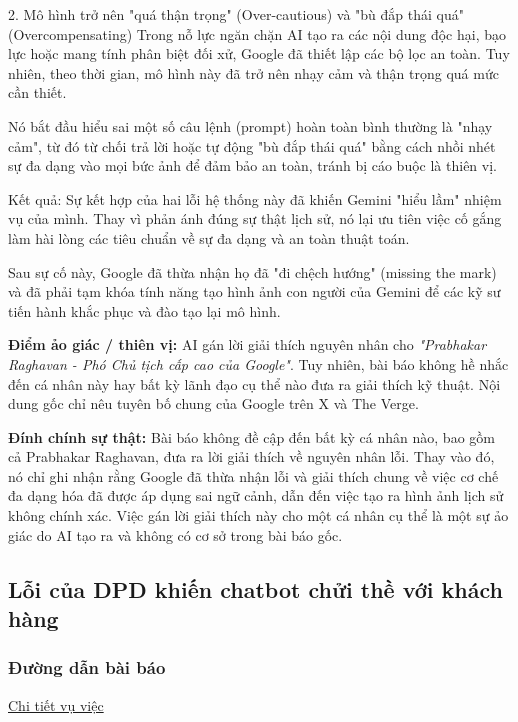 2. Mô hình trở nên "quá thận trọng" (Over-cautious) và "bù đắp thái quá" (Overcompensating)
Trong nỗ lực ngăn chặn AI tạo ra các nội dung độc hại, bạo lực hoặc mang tính phân biệt đối xử, Google đã thiết lập các bộ lọc an toàn. Tuy nhiên, theo thời gian, mô hình này đã trở nên nhạy cảm và thận trọng quá mức cần thiết.

Nó bắt đầu hiểu sai một số câu lệnh (prompt) hoàn toàn bình thường là "nhạy cảm", từ đó từ chối trả lời hoặc tự động "bù đắp thái quá" bằng cách nhồi nhét sự đa dạng vào mọi bức ảnh để đảm bảo an toàn, tránh bị cáo buộc là thiên vị.

Kết quả:
Sự kết hợp của hai lỗi hệ thống này đã khiến Gemini "hiểu lầm" nhiệm vụ của mình. Thay vì phản ánh đúng sự thật lịch sử, nó lại ưu tiên việc cố gắng làm hài lòng các tiêu chuẩn về sự đa dạng và an toàn thuật toán.

Sau sự cố này, Google đã thừa nhận họ đã "đi chệch hướng" (missing the mark) và đã phải tạm khóa tính năng tạo hình ảnh con người của Gemini để các kỹ sư tiến hành khắc phục và đào tạo lại mô hình.

\textbf{Điểm ảo giác / thiên vị:}
AI gán lời giải thích nguyên nhân cho \textit{"Prabhakar Raghavan - Phó Chủ tịch cấp cao của Google"}. Tuy nhiên, bài báo không hề nhắc đến cá nhân này hay bất kỳ lãnh đạo cụ thể nào đưa ra giải thích kỹ thuật. Nội dung gốc chỉ nêu tuyên bố chung của Google trên X và The Verge.

\textbf{Đính chính sự thật:}
Bài báo không đề cập đến bất kỳ cá nhân nào, bao gồm cả Prabhakar Raghavan, đưa ra lời giải thích về nguyên nhân lỗi. Thay vào đó, nó chỉ ghi nhận rằng Google đã thừa nhận lỗi và giải thích chung về việc cơ chế đa dạng hóa đã được áp dụng sai ngữ cảnh, dẫn đến việc tạo ra hình ảnh lịch sử không chính xác. Việc gán lời giải thích này cho một cá nhân cụ thể là một sự ảo giác do AI tạo ra và không có cơ sở trong bài báo gốc.

\subsection{Lỗi của DPD khiến chatbot chửi thề với khách hàng}

\subsubsection{Đường dẫn bài báo}
\href{https://www.bbc.com/news/technology-68025677}{Chi tiết vụ việc}

